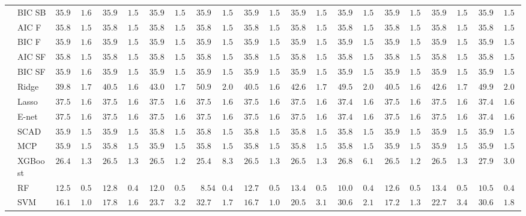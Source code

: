 \documentclass[12pt]{article}
\begin{document}
{\begin{landscape}
\begin{tabular}{ll|ll|llllll|llllll|llllll}
 & BIC SB  & $35.95$ & $1.60$ & $35.93$ & $1.58$ & $35.94$ & $1.56$ & $35.95$ & $1.58$ & $35.94$ & $1.57$ & $35.93$ & $1.56$ & $35.93$ & $1.57$ & $35.95$ & $1.57$ & $35.95$ & $1.57$ & $35.94$ & $1.57$ \\
 & AIC F  & $35.83$ & $1.56$ & $35.83$ & $1.56$ & $35.83$ & $1.56$ & $35.82$ & $1.56$ & $35.83$ & $1.56$ & $35.84$ & $1.56$ & $35.85$ & $1.56$ & $35.83$ & $1.57$ & $35.83$ & $1.57$ & $35.84$ & $1.56$ \\
 & BIC F  & $35.95$ & $1.60$ & $35.93$ & $1.58$ & $35.95$ & $1.56$ & $35.95$ & $1.58$ & $35.94$ & $1.57$ & $35.93$ & $1.56$ & $35.94$ & $1.58$ & $35.95$ & $1.57$ & $35.95$ & $1.57$ & $35.94$ & $1.57$ \\
 & AIC SF  & $35.83$ & $1.56$ & $35.83$ & $1.56$ & $35.83$ & $1.56$ & $35.82$ & $1.56$ & $35.83$ & $1.56$ & $35.84$ & $1.56$ & $35.85$ & $1.56$ & $35.83$ & $1.57$ & $35.83$ & $1.57$ & $35.84$ & $1.56$ \\
 & BIC SF  & $35.95$ & $1.60$ & $35.93$ & $1.58$ & $35.95$ & $1.56$ & $35.95$ & $1.58$ & $35.94$ & $1.57$ & $35.93$ & $1.56$ & $35.94$ & $1.58$ & $35.95$ & $1.57$ & $35.95$ & $1.57$ & $35.94$ & $1.57$ \\
 & Ridge  & $39.89$ & $1.73$ & $40.57$ & $1.68$ & $43.03$ & $1.79$ & $50.97$ & $2.04$ & $40.54$ & $1.69$ & $42.64$ & $1.72$ & $49.55$ & $2.09$ & $40.53$ & $1.68$ & $42.61$ & $1.74$ & $49.95$ & $2.01$ \\
 & Lasso  & $37.57$ & $1.67$ & $37.54$ & $1.66$ & $37.53$ & $1.67$ & $37.53$ & $1.68$ & $37.51$ & $1.66$ & $37.54$ & $1.65$ & $37.45$ & $1.66$ & $37.54$ & $1.65$ & $37.52$ & $1.65$ & $37.44$ & $1.67$ \\
 & E-net  & $37.57$ & $1.67$ & $37.54$ & $1.66$ & $37.53$ & $1.68$ & $37.54$ & $1.68$ & $37.51$ & $1.67$ & $37.55$ & $1.65$ & $37.45$ & $1.67$ & $37.54$ & $1.66$ & $37.53$ & $1.66$ & $37.43$ & $1.66$ \\
 & SCAD  & $35.91$ & $1.57$ & $35.90$ & $1.57$ & $35.89$ & $1.57$ & $35.89$ & $1.58$ & $35.89$ & $1.58$ & $35.89$ & $1.58$ & $35.89$ & $1.56$ & $35.91$ & $1.57$ & $35.90$ & $1.59$ & $35.90$ & $1.57$ \\
 & MCP  & $35.91$ & $1.56$ & $35.89$ & $1.56$ & $35.90$ & $1.58$ & $35.89$ & $1.58$ & $35.89$ & $1.57$ & $35.89$ & $1.59$ & $35.88$ & $1.56$ & $35.91$ & $1.57$ & $35.90$ & $1.59$ & $35.90$ & $1.57$ \\
 & XGBoost  & $26.48$ & $1.34$ & $26.56$ & $1.33$ & $26.55$ & $1.21$ & $25.45$ & $8.34$ & $26.56$ & $1.38$ & $26.50$ & $1.36$ & $26.82$ & $6.10$ & $26.56$ & $1.24$ & $26.59$ & $1.33$ & $27.96$ & $3.00$ \\
 & RF  & $12.54$ & $0.50$ & $12.80$ & $0.47$ & $12.01$ & $0.50$ & $\phantom{0}8.54$ & $0.41$ & $12.73$ & $0.54$ & $13.41$ & $0.53$ & $10.02$ & $0.44$ & $12.69$ & $0.55$ & $13.49$ & $0.55$ & $10.55$ & $0.48$ \\
 & SVM  & $16.16$ & $1.04$ & $17.81$ & $1.68$ & $23.79$ & $3.20$ & $32.74$ & $1.72$ & $16.77$ & $1.06$ & $20.59$ & $3.10$ & $30.65$ & $2.15$ & $17.29$ & $1.38$ & $22.72$ & $3.48$ & $30.66$ & $1.84$ \\
\hline 
\end{tabular}
\end{landscape}}
\end{document}
